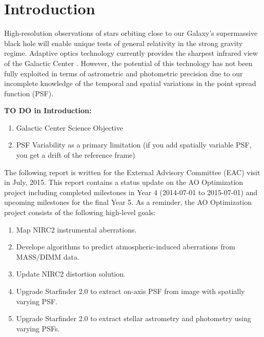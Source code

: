 \section{Introduction}

High-resolution observations of stars orbiting close to our Galaxy's supermassive black hole will enable unique tests of general relativity in the strong gravity regime. Adaptive optics technology currently provides the sharpest infrared view of the Galactic Center \cite{Ghez_2005}. However, the potential of this technology has not been fully exploited in terms of astrometric and photometric precision due to our incomplete knowledge of the temporal and spatial variations in the point spread function (PSF). 

{\bf TO DO in Introduction:}
\begin{enumerate}
\item Galactic Center Science Objective
\item PSF Variability as a primary limitation (if you add spatially variable PSF, you get a drift of the reference frame)
\end{enumerate}


The following report is written for the External Advisory Committee (EAC) visit in July, 2015. This report contains a status update on the AO Optimization project including completed milestones in Year 4 (2014-07-01 to 2015-07-01) and upcoming milestones for the final Year 5. As a reminder, the AO Optimization project consists of the following high-level goals:
\begin{enumerate}
\item Map NIRC2 instrumental aberrations.
\item Develope algorithms to predict atmospheric-induced aberrations from MASS/DIMM data.
\item Update NIRC2 distortion solution.
\item Upgrade Starfinder 2.0 to extract on-axis PSF from image with spatially varying PSF.
\item Upgrade Starfinder 2.0 to extract stellar astrometry and photometry using varying PSFs.
\end{enumerate}




    
    
    
    
    